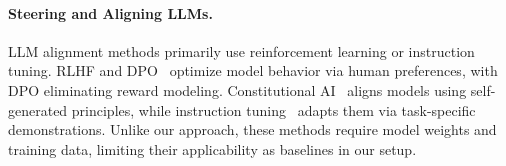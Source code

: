 \paragraph{Steering and Aligning LLMs.}  
LLM alignment methods primarily use reinforcement learning or instruction tuning. RLHF and DPO~\citep{christiano2017deep, ouyang2022training, rafailov2024direct} optimize model behavior via human preferences, with DPO eliminating reward modeling. Constitutional AI~\citep{bai2022constitutional} aligns models using self-generated principles, while instruction tuning~\citep{weifinetuned2021, sanhmultitask2022} adapts them via task-specific demonstrations. Unlike our approach, these methods require model weights and training data, limiting their applicability as baselines in our setup. 




